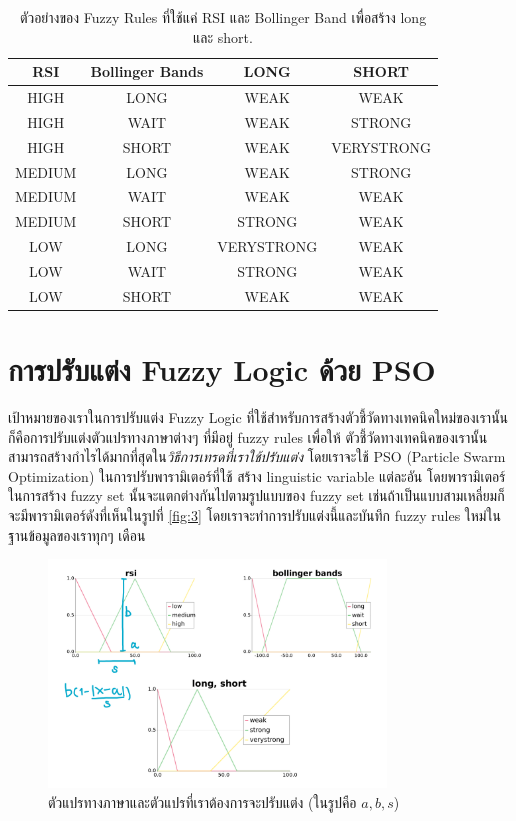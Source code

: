 \begin{table}[htp]
	\centering
	\begin{tabular}{c c c c}
		\toprule
        {RSI} & {Bollinger Bands} & {LONG} & {SHORT} \\ 
        \midrule
        HIGH & LONG & WEAK & WEAK \\
        HIGH & WAIT & WEAK & STRONG \\
        HIGH & SHORT & WEAK & VERYSTRONG \\
        MEDIUM & LONG & WEAK & STRONG \\
        MEDIUM & WAIT & WEAK & WEAK \\
        MEDIUM & SHORT & STRONG & WEAK \\
        LOW & LONG & VERYSTRONG & WEAK \\
        LOW & WAIT & STRONG & WEAK \\
        LOW & SHORT & WEAK & WEAK \\
        \bottomrule
    \end{tabular} 
    \caption{ตัวอย่างของ Fuzzy Rules ที่ใช้แค่ RSI และ Bollinger Band เพื่อสร้าง long และ short.}
	\label{table:1}
\end{table}
\FloatBarrier

\section{การปรับแต่ง Fuzzy Logic ด้วย PSO}
เป้าหมายของเราในการปรับแต่ง Fuzzy Logic ที่ใช้สำหรับการสร้างตัวชี้วัดทางเทคนิคใหม่ของเรานั้น ก็คือการปรับแต่งตัวแปรทางภาษาต่างๆ ที่มีอยู่ fuzzy rules เพื่อให้
ตัวชี้วัดทางเทคนิคของเรานั้นสามารถสร้างกำไรได้มากที่สุดใน\emph{วิธีการเทรดที่เราใช้ปรับแต่ง} โดยเราจะใช้ PSO (Particle Swarm Optimization) ในการปรับพารามิเตอร์ที่ใช้
สร้าง linguistic variable แต่ละอัน โดยพารามิเตอร์ในการสร้าง fuzzy set นั้นจะแตกต่างกันไปตามรูปแบบของ fuzzy set 
เช่นถ้าเป็นแบบสามเหลี่ยมก็จะมีพารามิเตอร์ดังที่เห็นในรูปที่ \ref{fig:3} โดยเราจะทำการปรับแต่งนี้และบันทึก fuzzy rules ใหม่ในฐานข้อมูลของเราทุกๆ เดือน

\begin{figure}[ht]
    \centering
    \includegraphics[width=0.8\textwidth]{images/linguisticv.png}
    \caption{ตัวแปรทางภาษาและตัวแปรที่เราต้องการจะปรับแต่ง (ในรูปคือ $a, b, s$)}
    \label{fig:9}
\end{figure}


